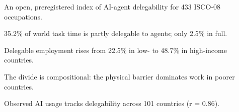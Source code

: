 \begin{highlights}
\item An open, preregistered index of AI-agent delegability for 433 ISCO-08 occupations.
\item 35.2\% of world task time is partly delegable to agents; only 2.5\% in full.
\item Delegable employment rises from 22.5\% in low- to 48.7\% in high-income countries.
\item The divide is compositional: the physical barrier dominates work in poorer countries.
\item Observed AI usage tracks delegability across 101 countries (r = 0.86).
\end{highlights}
